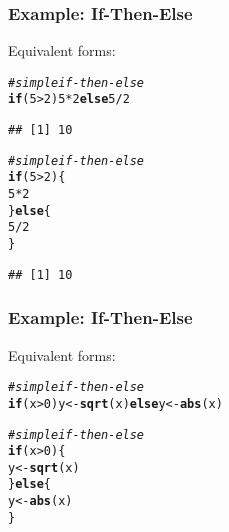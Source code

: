 \documentclass[12pt]{beamer}\usepackage[]{graphicx}\usepackage[]{color}
\makeatletter
\newcommand{\hlnum}[1]{\textcolor[rgb]{0.686,0.059,0.569}{#1}}%
\newcommand{\hlcom}[1]{\textcolor[rgb]{0.678,0.584,0.686}{\textit{#1}}}%
\newcommand{\hlopt}[1]{\textcolor[rgb]{0,0,0}{#1}}%
\newcommand{\hlstd}[1]{\textcolor[rgb]{0.345,0.345,0.345}{#1}}%
\newcommand{\hlkwa}[1]{\textcolor[rgb]{0.161,0.373,0.58}{\textbf{#1}}}%
\newcommand{\hlkwb}[1]{\textcolor[rgb]{0.69,0.353,0.396}{#1}}%
\newcommand{\hlkwd}[1]{\textcolor[rgb]{0.737,0.353,0.396}{\textbf{#1}}}%
\newenvironment{kframe}{%
 \def\at@end@of@kframe{}%
 \ifinner\ifhmode%
  \def\at@end@of@kframe{\end{minipage}}%
  \begin{minipage}{\columnwidth}%
 \fi\fi%
 \def\FrameCommand##1{\hskip\@totalleftmargin \hskip-\fboxsep
 \colorbox{shadecolor}{##1}\hskip-\fboxsep
     \hskip-\linewidth \hskip-\@totalleftmargin \hskip\columnwidth}%
 \MakeFramed {\advance\hsize-\width
   \@totalleftmargin\z@ \linewidth\hsize
   \@setminipage}}%
 {\par\unskip\endMakeFramed%
 \at@end@of@kframe}
\newenvironment{knitrout}{}{} %
\makeatother
\begin{document}

\begin{frame}[fragile]
\frametitle{Example: If-Then-Else}

Equivalent forms:
\begin{knitrout}\footnotesize
{}\color{fgcolor}\begin{kframe}
\begin{alltt}
\hlcom{# simple if-then-else}
\hlkwa{if} \hlstd{(}\hlnum{5} \hlopt{>} \hlnum{2}\hlstd{)} \hlnum{5} \hlopt{*} \hlnum{2} \hlkwa{else} \hlnum{5} \hlopt{/} \hlnum{2}
\end{alltt}
\begin{verbatim}
## [1] 10
\end{verbatim}
\begin{alltt}
\hlcom{# simple if-then-else}
\hlkwa{if} \hlstd{(}\hlnum{5} \hlopt{>} \hlnum{2}\hlstd{) \{}
  \hlnum{5} \hlopt{*} \hlnum{2}
\hlstd{\}} \hlkwa{else} \hlstd{\{}
  \hlnum{5} \hlopt{/} \hlnum{2}
\hlstd{\}}
\end{alltt}
\begin{verbatim}
## [1] 10
\end{verbatim}
\end{kframe}
\end{knitrout}

\end{frame}


\begin{frame}[fragile]
\frametitle{Example: If-Then-Else}

Equivalent forms:
\begin{knitrout}\footnotesize
{}\color{fgcolor}\begin{kframe}
\begin{alltt}
\hlcom{# simple if-then-else}
\hlkwa{if} \hlstd{(x} \hlopt{>} \hlnum{0}\hlstd{) y} \hlkwb{<-} \hlkwd{sqrt}\hlstd{(x)} \hlkwa{else} \hlstd{y} \hlkwb{<-} \hlkwd{abs}\hlstd{(x)}

\hlcom{# simple if-then-else}
\hlkwa{if} \hlstd{(x} \hlopt{>} \hlnum{0}\hlstd{) \{}
  \hlstd{y} \hlkwb{<-} \hlkwd{sqrt}\hlstd{(x)}
\hlstd{\}} \hlkwa{else} \hlstd{\{}
  \hlstd{y} \hlkwb{<-} \hlkwd{abs}\hlstd{(x)}
\hlstd{\}}
\end{alltt}
\end{kframe}
\end{knitrout}

\end{frame}
\end{document}
